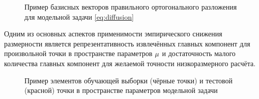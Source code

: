 \begin{figure}[ht]
    \caption{Пример базисных векторов правильного ортогонального разложения для модельной задачи \ref{eq:diffusion}~\cite{Elizarev2022}}\label{fig:POD}
\end{figure}

Одним из основных аспектов применимости эмпирического снижения размерности является репрезентативность извлечённых главных компонент для произвольной точки в пространстве параметров $\mathbf{\mu}$ и достаточность малого количества главных компонент для желаемой точности низкоразмерного расчёта.

\begin{figure}[ht]
    \caption{Пример элементов обучающей выборки (чёрные точки) и тестовой (красной) точки в пространстве параметров модельной задачи~\cite{Elizarev2022}}\label{fig:params}
\end{figure}

